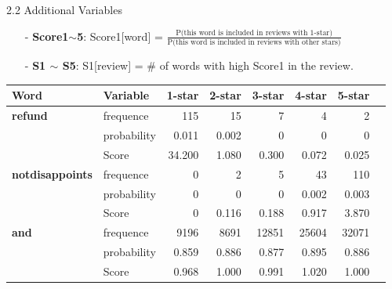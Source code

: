 \documentclass[10pt]{beamer}
\begin{document}
\begin{frame}{2.2 Additional Variables}

\begin{itemize}
\item[-] \textbf{Score1$\sim$5}: Score1[word] = $\frac{\text{P(this word is included in reviews with 1-star)}}{\text{P(this word is included in reviews with other stars)}}$\\
\item[-] \textbf{S1 $\sim$ S5}: S1[review] = \# of words with high Score1 in the review.
\end{itemize}

\begin{table}[ht]

\centering %
\begin{tabular}{l l r r r r r r} %
	\hline %
	Word   &Variable  & 1-star & 2-star & 3-star & 4-star & 5-star  \\ [0.5ex] %
	\hline %
	\textbf{refund}         & frequence   & 115    & 15     & 7      & 4      & 2      \\
	& probability & 0.011  & 0.002  & 0      & 0      & 0      \\
	& Score     & 34.200 & 1.080  & 0.300  & 0.072  & 0.025  \\
	\hline
	\textbf{notdisappoints} & frequence   & 0      & 2      & 5      & 43     & 110   \\
	& probability & 0      & 0      & 0      & 0.002  & 0.003  \\
	& Score     & 0      & 0.116  & 0.188  & 0.917  & 3.870  \\
	\hline
	\textbf{and}            & frequence   & 9196   & 8691   & 12851  & 25604  & 32071  \\
	& probability & 0.859  & 0.886  & 0.877  & 0.895  & 0.886  \\
	& Score     & 0.968  & 1.000  & 0.991  & 1.020  & 1.000  \\
	
	\hline %
\end{tabular}
\label{table:nonlin} %
\end{table}

\end{frame}
\end{document}
